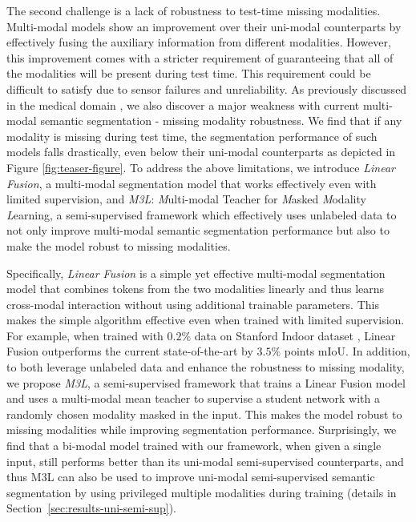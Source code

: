 \documentclass[10pt,twocolumn,letterpaper]{article}
\begin{document}
The second challenge is a lack of robustness to test-time missing modalities.  
Multi-modal models show an improvement over their uni-modal counterparts by effectively fusing the auxiliary information from different modalities. However, this improvement comes with a stricter requirement of guaranteeing that all of the modalities will be present during test time. This requirement could be difficult to satisfy due to sensor failures and unreliability. As previously discussed in the medical domain \cite{shen2019brain, urn, dorent2019hetero}, we also discover a major weakness with current multi-modal semantic segmentation - missing modality robustness. We find that if any modality is missing during test time, the segmentation performance of such models falls drastically, even below their uni-modal counterparts as depicted in Figure \ref{fig:teaser-figure}. 
To address the above limitations, we introduce \emph{Linear Fusion}, a multi-modal segmentation model that works effectively even with limited supervision, and \emph{M3L}: \emph{M}ulti-modal Teacher for \emph{M}asked \emph{M}odality \emph{L}earning, a semi-supervised framework which effectively uses unlabeled data to not only improve multi-modal semantic segmentation performance but also to make the model robust to missing modalities.

Specifically, \emph{Linear Fusion} is a simple yet effective multi-modal segmentation model that combines tokens from the two modalities linearly and thus learns cross-modal interaction without using additional trainable parameters. This makes the simple algorithm effective even when trained with limited supervision. 
For example, when trained with $0.2\%$ data on Stanford Indoor dataset \cite{stanfordindoor}, Linear Fusion outperforms the current state-of-the-art by $3.5\%$ points mIoU. In addition, to both leverage unlabeled data and enhance the robustness to missing modality, we propose \emph{M3L}, a semi-supervised framework that trains a Linear Fusion model and uses a multi-modal mean teacher to supervise a student network with a randomly chosen modality masked in the input. This makes the model robust to missing modalities while improving segmentation performance. Surprisingly, we find that a bi-modal model trained with our framework, when given a single input, still performs better than its uni-modal semi-supervised counterparts, and thus M3L can also be used to improve uni-modal semi-supervised semantic segmentation by using privileged multiple modalities during training (details in Section~\ref{sec:results-uni-semi-sup}). 
\end{document}
